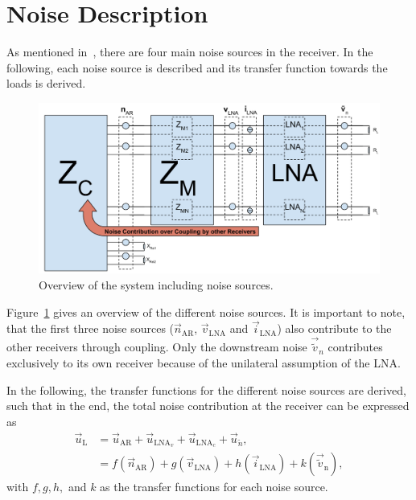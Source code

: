 \section{Noise Description}
\label{sec:noise_description}

As mentioned in~\cite{Yahia2013}, there are four main noise sources in the receiver.
In the following, each noise source is described and its transfer function towards the loads is derived. 
\begin{figure}[h]
\begin{center}
\includegraphics[width=\textwidth]{images/Full_Receiver_noise.png}
\caption{Overview of the system including noise sources.}
\label{fig:receiver_noise}
\end{center}
\end{figure}

Figure~\ref{fig:receiver_noise} gives an overview of the different noise sources.
It is important to note, that the first three noise sources ($\vec{n}_\text{AR}$, $\vec{v}_\text{LNA}$ and $\vec{i}_\text{LNA}$) also contribute to the other receivers through coupling.
Only the downstream noise $\vec{\tilde{v}}_n$ contributes exclusively to its own receiver because of the unilateral assumption of the LNA.

In the following, the transfer functions for the different noise sources are derived, such that in the end, the total noise contribution at the receiver can be expressed as
\begin{align}\nonumber
\label{eq:noise_contrib}
\vec{u}_\text{L} &= \vec{u}_\text{AR} + \vec{u}_{\text{LNA}_v} + \vec{u}_{\text{LNA}_c} + \vec{u}_{\tilde{n}},\\
&= f(\vec{n}_\text{AR}) + g(\vec{v}_\text{LNA}) + h(\vec{i}_\text{LNA}) + k(\vec{\tilde{v}}_\text{n}),
\end{align}
with $f,g,h,$ and $k$ as the transfer functions for each noise source.

